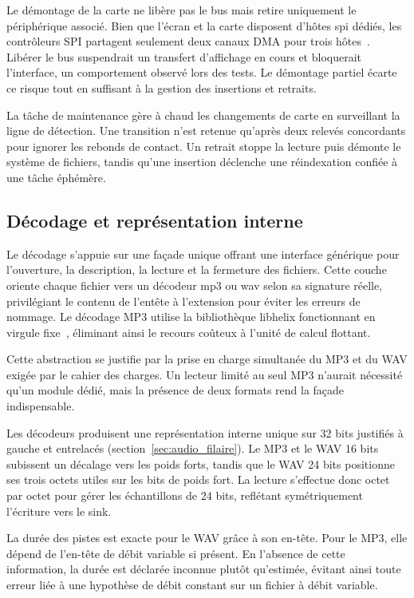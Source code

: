Le démontage de la carte ne libère pas le bus mais retire uniquement le périphérique associé. Bien que l'écran et la carte disposent d'hôtes \gls{spi} dédiés, les contrôleurs SPI partagent seulement deux canaux DMA pour trois hôtes~\cite{ESP32_Technical_Reference_Manual}. Libérer le bus suspendrait un transfert d'affichage en cours et bloquerait l'interface, un comportement observé lors des tests. Le démontage partiel écarte ce risque tout en suffisant à la gestion des insertions et retraits.

La tâche de maintenance gère à chaud les changements de carte en surveillant la ligne de détection. Une transition n'est retenue qu'après deux relevés concordants pour ignorer les rebonds de contact. Un retrait stoppe la lecture puis démonte le système de fichiers, tandis qu'une insertion déclenche une réindexation confiée à une tâche éphémère.

\subsection{Décodage et représentation interne}

Le décodage s'appuie sur une façade unique offrant une interface générique pour l'ouverture, la description, la lecture et la fermeture des fichiers. Cette couche oriente chaque fichier vers un décodeur \gls{mp3} ou \gls{wav} selon sa signature réelle, privilégiant le contenu de l'entête à l'extension pour éviter les erreurs de nommage. Le décodage MP3 utilise la bibliothèque libhelix fonctionnant en virgule fixe~\cite{helix_mp3_decoder}, éliminant ainsi le recours coûteux à l'unité de calcul flottant.

Cette abstraction se justifie par la prise en charge simultanée du MP3 et du WAV exigée par le cahier des charges. Un lecteur limité au seul MP3 n'aurait nécessité qu'un module dédié, mais la présence de deux formats rend la façade indispensable.

Les décodeurs produisent une représentation interne unique sur 32 bits justifiés à gauche et entrelacés (section~\ref{sec:audio_filaire}). Le MP3 et le WAV 16 bits subissent un décalage vers les poids forts, tandis que le WAV 24 bits positionne ses trois octets utiles sur les bits de poids fort. La lecture s'effectue donc octet par octet pour gérer les échantillons de 24 bits, reflétant symétriquement l'écriture vers le sink.

La durée des pistes est exacte pour le WAV grâce à son en-tête. Pour le MP3, elle dépend de l'en-tête de débit variable si présent. En l'absence de cette information, la durée est déclarée inconnue plutôt qu'estimée, évitant ainsi toute erreur liée à une hypothèse de débit constant sur un fichier à débit variable.

